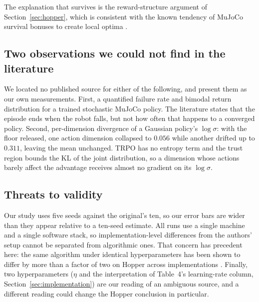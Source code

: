 The explanation that survives is the reward-structure argument of
Section~\ref{sec:hopper}, which is consistent with the known tendency of
MuJoCo survival bonuses to create local optima \citep{mania2018ars,
reda2020locomote}.

\subsection{Two observations we could not find in the literature}

We located no published source for either of the following, and present them
as our own measurements. First, a quantified failure rate and bimodal return
distribution for a trained stochastic MuJoCo policy. The literature states
that the episode ends when the robot falls, but not how often that happens to
a converged policy. Second, per-dimension divergence of a Gaussian policy's
$\log\sigma$: with the floor released, one action dimension collapsed to
$0.056$ while another drifted up to $0.311$, leaving the mean unchanged. TRPO
has no entropy term and the trust region bounds the KL of the joint
distribution, so a dimension whose actions barely affect the advantage
receives almost no gradient on its $\log\sigma$.

\subsection{Threats to validity}

Our study uses five seeds against the original's ten, so our error bars are
wider than they appear relative to a ten-seed estimate. All runs use a single
machine and a single software stack, so implementation-level differences from
the authors' setup cannot be separated from algorithmic ones. That concern has
precedent here: the same algorithm under identical hyperparameters has been
shown to differ by more than a factor of two on Hopper across implementations
\citep{henderson2018matters}. Finally, two hyperparameters ($\eta$ and the
interpretation of Table~4's learning-rate column,
Section~\ref{sec:implementation}) are our reading of an ambiguous source, and
a different reading could change the Hopper conclusion in particular.
